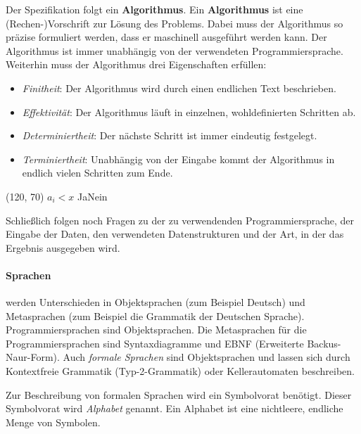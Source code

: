 \documentclass{scrreprt}
\begin{document}
Der Spezifikation folgt ein \textbf{Algorithmus}.
Ein \textbf{Algorithmus} ist eine (Rechen-)Vorschrift zur Lösung des Problems.
Dabei muss der Algorithmus so präzise formuliert werden, dass er maschinell
ausgeführt werden kann.
Der Algorithmus ist immer unabhängig von der verwendeten Programmiersprache.
Weiterhin muss der Algorithmus drei Eigenschaften erfüllen:
\begin{itemize}
\item \emph{Finitheit}: Der Algorithmus wird durch einen endlichen Text
  beschrieben.
\item \emph{Effektivität}: Der Algorithmus läuft in einzelnen, wohldefinierten
  Schritten ab.
\item \emph{Determiniertheit}: Der nächste Schritt ist immer eindeutig
  festgelegt.
\item \emph{Terminiertheit}: Unabhängig von der Eingabe kommt der Algorithmus
  in endlich vielen Schritten zum Ende.
\end{itemize}

\begin{struktogramm}(120, 70)
     {$a_i < x$} {Ja}{Nein}
      \change
    \ifend
  \whileend
\end{struktogramm}

Schließlich folgen noch Fragen zu der zu verwendenden Programmiersprache,
der Eingabe der Daten, den verwendeten Datenstrukturen und der Art, in der das
Ergebnis ausgegeben wird.

\paragraph{Sprachen} werden Unterschieden in Objektsprachen (zum Beispiel
Deutsch) und Metasprachen (zum Beispiel die Grammatik der Deutschen Sprache).
Programmiersprachen sind Objektsprachen.
Die Metasprachen für die Programmiersprachen sind Syntaxdiagramme
und EBNF (Erweiterte Backus-Naur-Form).
Auch \emph{formale Sprachen} sind Objektsprachen und lassen sich durch
Kontextfreie Grammatik (Typ-2-Grammatik) oder Kellerautomaten beschreiben.

Zur Beschreibung von formalen Sprachen wird ein Symbolvorat benötigt.
Dieser Symbolvorat wird \emph{Alphabet} genannt.
Ein Alphabet ist eine nichtleere, endliche Menge von Symbolen.
\end{document}

